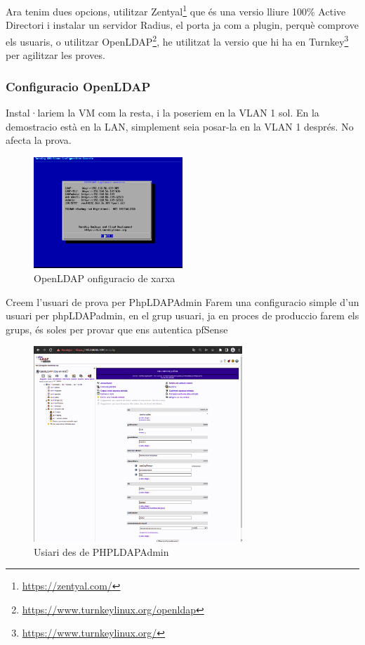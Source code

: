 \documentclass[
  10pt,
]{krantz}
\DeclareRobustCommand{\href}[2]{#2\footnote{\url{#1}}}
\begin{document}
Ara tenim dues opcions, utilitzar \href{https://zentyal.com/}{Zentyal} que és una versio lliure 100\% Active Directori i instalar un servidor Radius, el porta ja com a plugin, perquè comprove els usuaris, o utilitzar \href{https://www.turnkeylinux.org/openldap}{OpenLDAP}, he utilitzat la versio que hi ha en \href{https://www.turnkeylinux.org/}{Turnkey} per agilitzar les proves.

\hypertarget{configuracio-openldap}{%
\subsubsection{Configuracio OpenLDAP}\label{configuracio-openldap}}

Instal·lariem la VM com la resta, i la poseriem en la VLAN 1 sol. En la demostracio està en la LAN, simplement seia posar-la en la VLAN 1 després. No afecta la prova.

\begin{figure}
\centering
\includegraphics[width=0.5\textwidth,height=\textheight]{imatges/proxmox/OpenLDAP_conf1.png}
\caption{OpenLDAP onfiguracio de xarxa}
\end{figure}

Creem l'usuari de prova per PhpLDAPAdmin Farem una configuracio simple d'un usuari per phpLDAPadmin, en el grup usuari, ja en proces de produccio farem els grups, és soles per provar que ens autentica pfSense

\begin{figure}
\centering
\includegraphics[width=0.7\textwidth,height=\textheight]{imatges/proxmox/PHPLDAPAdmin.png}
\caption{Usiari des de PHPLDAPAdmin}
\end{figure}
\end{document}

